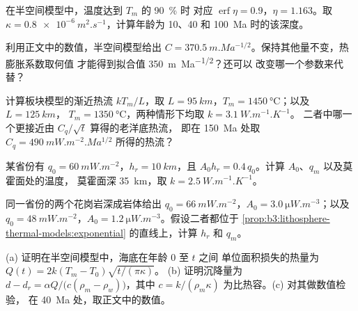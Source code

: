 \begin{exercise}[$\star\star$]\label{exo:b3:lithosphere-thermal-models:5}
在半空间模型中，温度达到 $T_m$ 的 \qty{90}{\percent} 时
对应 $\operatorname{erf}\eta = 0.9$，$\eta = 1.163$。取 $\kappa =
\qty{0.8e-6}{m^2.s^{-1}}$，计算年龄为 10、40 和 \qty{100}{Ma} 时的该深度。
\end{exercise}

\begin{exercise}[$\star\star$]\label{exo:b3:lithosphere-thermal-models:6}
利用正文中的数值，半空间模型给出 $C =
\qty{370.5}{m.Ma^{-1/2}}$。保持其他量不变，热膨胀系数取何值
才能得到拟合值 \qty{350}{m.Ma^{-1/2}}？还可以
改变哪一个参数来代替？
\end{exercise}

\begin{exercise}[$\star\star$]\label{exo:b3:lithosphere-thermal-models:7}
计算板块模型的渐近热流 $kT_m/L$，取 $L =
\qty{95}{km}$，$T_m = \qty{1450}{\celsius}$；以及 $L = \qty{125}{km}$，
$T_m = \qty{1350}{\celsius}$，两种情形下均取 $k = \qty{3.1}{W.m^{-1}.K^{-1}}$。
二者中哪一个更接近由 $C_q/\sqrt t$ 算得的老洋底热流，
即在 \qty{150}{Ma} 处取 $C_q = \qty{490}{mW.m^{-2}.Ma^{1/2}}$ 所得的热流？
\end{exercise}

\begin{exercise}[$\star\star$]\label{exo:b3:lithosphere-thermal-models:8}
某省份有 $q_0 = \qty{60}{mW.m^{-2}}$，$h_r = \qty{10}{km}$，且 $A_0h_r =
0.4\,q_0$。计算 $A_0$、$q_m$ 以及莫霍面处的温度，
莫霍面深 \qty{35}{km}，取 $k = \qty{2.5}{W.m^{-1}.K^{-1}}$。
\end{exercise}

\begin{exercise}[$\star\star$]\label{exo:b3:lithosphere-thermal-models:9}
同一省份的两个花岗岩深成岩体给出 $q_0 = \qty{66}{mW.m^{-2}}$，$A_0
= \qty{3.0}{\micro W.m^{-3}}$；以及 $q_0 = \qty{48}{mW.m^{-2}}$，$A_0 =
\qty{1.2}{\micro W.m^{-3}}$。假设二者都位于
\cref{prop:b3:lithosphere-thermal-models:exponential} 的直线上，计算 $h_r$ 和 $q_m$。
\end{exercise}

\begin{exercise}[$\star\star\star$]\label{exo:b3:lithosphere-thermal-models:10}
(a) 证明在半空间模型中，海底在年龄 0 至 $t$ 之间
单位面积损失的热量为 $Q(t) = 2k(T_m - T_0)\sqrt{t/(\pi\kappa)}$。
(b) 证明沉降量为 $d - d_r = \alpha Q/\bigl(c(\rho_m -
\rho_w)\bigr)$，其中 $c = k/(\rho_m\kappa)$ 为比热容。(c) 对其做数值检验，
在 \qty{40}{Ma} 处，取正文中的数值。
\end{exercise}

